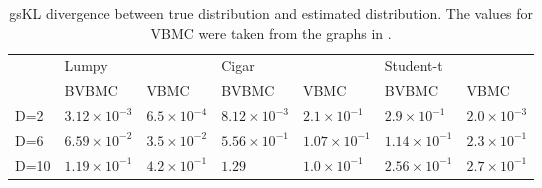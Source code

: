 \begin{table}[]
	\begin{tabular}{l|l|l|l|l|l|l|}
		\cline{2-7}
		& \multicolumn{2}{l|}{Lumpy} & \multicolumn{2}{l|}{Cigar} & \multicolumn{2}{l|}{Student-t} \\ \cline{2-7} 
		& BVBMC         & VBMC        & BVBMC         & VBMC        & BVBMC         & VBMC        \\ \hline
		\multicolumn{1}{|l|}{D=2}  & $3.12 \times 10^{-3}$        & $6.5 \times 10^{-4}$         & $8.12 \times 10^{-3}$           & $2.1 \times 10^{-1}$         & $2.9 \times 10^{-1}$          & $2.0 \times 10^{-3}$         \\ \hline
		\multicolumn{1}{|l|}{D=6}  & $6.59 \times 10^{-2}$         & $ 3.5 \times 10^{-2}$         & $5.56 \times 10^{-1}$           & $ 1.07 \times 10^{-1}$        & $1.14 \times 10^{-1}$           & $2.3 \times 10^{-1}$         \\ \hline
		\multicolumn{1}{|l|}{D=10} & $1.19 \times 10^{-1}$           & $ 4.2 \times 10^{-1}$         & $1.29 $           &  $ 1.0 \times 10^{-1}$        & $2.56 \times 10^{-1}$           & $ 2.7 \times 10^{-1}$        \\ \hline
	\end{tabular}
	\caption{gsKL divergence between true distribution and estimated distribution. The values for VBMC were taken from the graphs in \cite{Acerbi_2018}.}\label{toytable}
\end{table}

